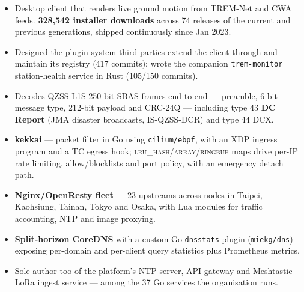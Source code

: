 \documentclass[10pt,a4paper]{article}
\begin{document}
\begin{itemize}
  \item Desktop client that renders live ground motion from TREM-Net and CWA feeds. \textbf{328,542 installer
        downloads} across 74 releases of the current and previous generations, shipped continuously since Jan 2023.
  \item Designed the plugin system third parties extend the client through and maintain its registry (417 commits);
        wrote the companion \texttt{trem-monitor} station-health service in Rust (105/150 commits).
\end{itemize}

\begin{itemize}
  \item Decodes QZSS L1S 250-bit SBAS frames end to end — preamble, 6-bit message type, 212-bit payload and
        CRC-24Q — including type 43 \textbf{DC Report} (JMA disaster broadcasts, IS-QZSS-DCR) and type 44 DCX.
\end{itemize}

\begin{itemize}
  \item \textbf{kekkai} — packet filter in Go using \texttt{cilium/ebpf}, with an XDP ingress program and a TC egress
        hook; \textsc{lru\_hash}/\textsc{array}/\textsc{ringbuf} maps drive per-IP rate limiting, allow/blocklists and
        port policy, with an emergency detach path.
  \item \textbf{Nginx/OpenResty fleet} — 23 upstreams across nodes in Taipei, Kaohsiung, Tainan, Tokyo and Osaka,
        with Lua modules for traffic accounting, NTP and image proxying.
  \item \textbf{Split-horizon CoreDNS} with a custom Go \texttt{dnsstats} plugin (\texttt{miekg/dns}) exposing
        per-domain and per-client query statistics plus Prometheus metrics.
  \item Sole author too of the platform's NTP server, API gateway and Meshtastic LoRa ingest service — among the
        37 Go services the organisation runs.
\end{itemize}
\end{document}
